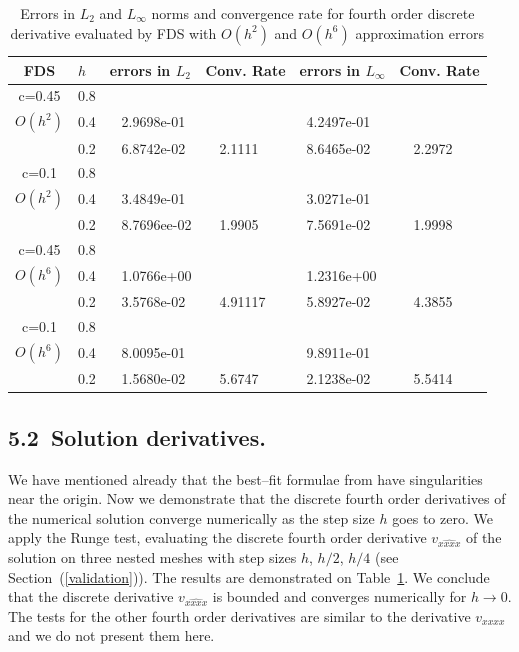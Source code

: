 \documentclass[leqno,11pt]{book}
\newcommand{\rf}[1]{(\ref{#1})}
\begin{document}
 \begin{center}
\begin{table}[ht]
\centering
		\begin{tabular}{||c|l|ll|ll||}
			\hline
			\hline
      FDS       & $h$ &errors in $L_2$&Conv. Rate& errors in $L_\infty$&Conv. Rate\\
   			\hline 
					\hline 
      c=0.45    &0.8    &             &            &           &   \\
   $O(h^2)$     &0.4    &~ 2.9698e-01  &            &~4.2497e-01 &   \\
                &0.2   &~ 6.8742e-02  &~~2.1111  &~8.6465e-02 &~~2.2972 \\
               	 \hline 
     c=0.1      &0.8   &             &           &                & \\
     $O(h^2)$   &0.4   &~ 3.4849e-01  &             &~3.0271e-01      &    \\
                &0.2  &~ 8.7696ee-02 &~~1.9905       &~7.5691e-02      &~~1.9998  \\
			\hline
			\hline 	
      c=0.45    &0.8   &            &            &             &    \\
       $O(h^6)$ &0.4   &~ 1.0766e+00   &           &~1.2316e+00  &   \\
                &0.2  &~ 3.5768e-02 &~~4.91117    &~5.8927e-02  &~~4.3855  \\
					  			\hline 	
     c=0.1      &0.8  &            &               &               &     \\
     $O(h^6)$  &0.4   &~ 8.0095e-01  &              &~9.8911e-01      &        \\
               &0.2  &~ 1.5680e-02&~~5.6747        &~2.1238e-02 &~~5.5414       \\
		   \hline
			\hline 
		\end{tabular}
		\caption{Errors  in $L_2$ and $L_\infty$ norms and  convergence  rate for  fourth order discrete derivative  evaluated by FDS with $O(h^2)$ and $O(h^6)$ approximation errors}
\label{tab:fourth-der}
\end{table}
\end{center}

\subsection{5.2~Solution derivatives.}

We have mentioned already that the best--fit formulae from \cite{Ch2011} have singularities near the origin. 
Now we demonstrate  that the discrete fourth order derivatives of the numerical solution converge numerically as the step size $h$ goes to zero.
We apply the Runge test, evaluating the discrete fourth order derivative $v_{\widehat{xxxx}}$ of the solution on three nested meshes with step sizes $h$, $h/2$, $h/4$ (see Section~\rf{validation}).  The results are demonstrated on Table~\ref{tab:fourth-der}.  
We conclude that the discrete  derivative $v_{\widehat{xxxx}}$ is bounded and converges numerically for $h\rightarrow 0$. The tests for the other fourth order derivatives are similar to the derivative $v_{xxxx}$ and we do not present them here.
\end{document}
